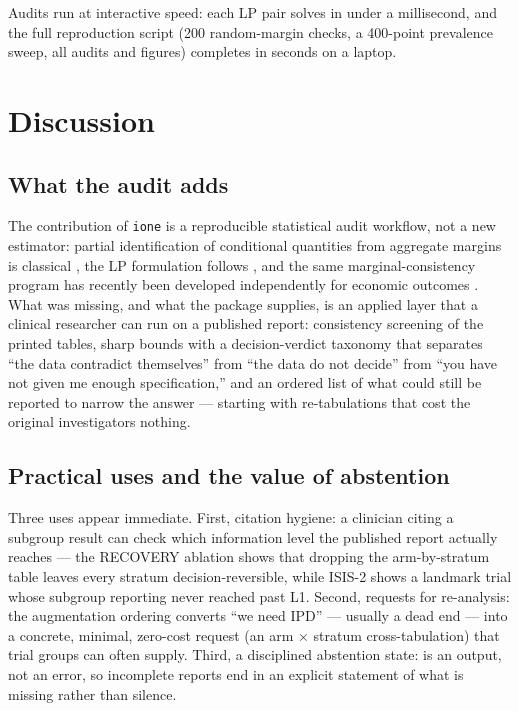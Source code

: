 \documentclass[article]{ajs}
\begin{document}
Audits run at interactive speed: each LP pair solves in under a
millisecond, and the full reproduction script (200 random-margin
checks, a 400-point prevalence sweep, all audits and figures) completes
in seconds on a laptop.

\section{Discussion}
\label{sec:discussion}

\subsection{What the audit adds}

The contribution of \texttt{ione} is a reproducible statistical audit
workflow, not a new estimator: partial identification of conditional
quantities from aggregate margins is classical
\citep{cross2002, manski2003, king1997}, the LP formulation follows
\citet{balke1997}, and the same marginal-consistency program has
recently been developed independently for economic outcomes
\citep{moon2026}. What was missing, and what the package supplies, is an
applied layer that a clinical researcher can run on a published report:
consistency screening of the printed tables, sharp bounds with a
decision-verdict taxonomy that separates ``the data contradict
themselves'' from ``the data do not decide'' from ``you have not given
me enough specification,'' and an ordered list of what could still be
reported to narrow the answer --- starting with re-tabulations that cost
the original investigators nothing.

\subsection{Practical uses and the value of abstention}

Three uses appear immediate. First, citation hygiene: a clinician citing
a subgroup result can check which information level the published report
actually reaches --- the RECOVERY ablation shows that dropping the
arm-by-stratum table leaves every stratum decision-reversible, while
ISIS-2 shows a landmark trial whose subgroup reporting never reached
past L1. Second,
requests for re-analysis: the augmentation ordering converts
``we need IPD'' --- usually a dead end --- into a concrete, minimal,
zero-cost request (an arm $\times$ stratum cross-tabulation) that trial
groups can often supply. Third, a disciplined abstention state:
 is an output, not an error, so incomplete reports end
in an explicit statement of what is missing rather than silence.
\end{document}
